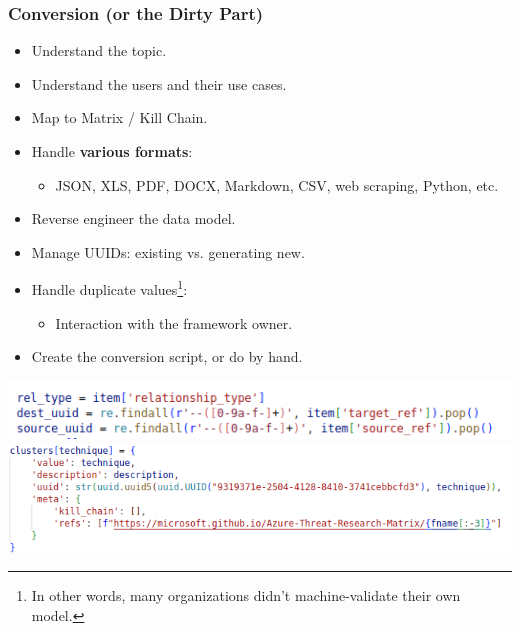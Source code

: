 \begin{frame}
        \frametitle{Conversion (or the Dirty Part)}
        \begin{itemize}
            \item Understand the topic.
            \item Understand the users and their use cases.
            \item Map to Matrix / Kill Chain.
            \item Handle \textbf{various formats}:
                \begin{itemize}
                    \item JSON, XLS, PDF, DOCX, Markdown, CSV, web scraping, Python, etc.
                \end{itemize}
            \item Reverse engineer the data model.
            \item Manage UUIDs: existing vs. generating new.
            \item Handle duplicate values\footnote{In other words, many organizations didn’t machine-validate their own model.}:
                \begin{itemize}
                    \item Interaction with the framework owner.
                \end{itemize}
            \item Create the conversion script, or do by hand.
        \end{itemize}
        \begin{center}
            \includegraphics[scale=0.3]{./screenshots/uuid-extraction.png}
            \includegraphics[scale=0.3]{./screenshots/uuid-generation.png}
        \end{center}
\end{frame}

